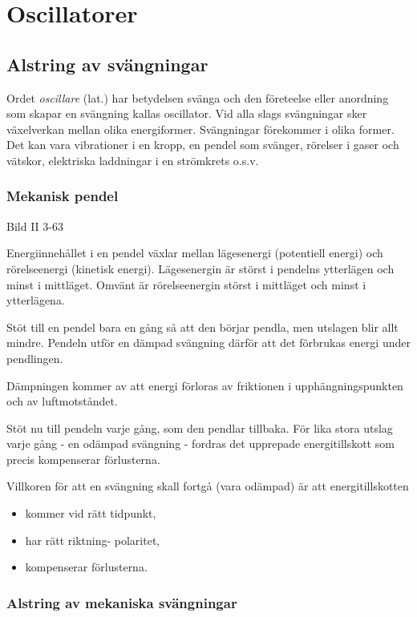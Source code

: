 \section{Oscillatorer}

\subsection{Alstring av svängningar}
Ordet \emph{oscillare} (lat.) har betydelsen svänga och den företeelse
eller anordning som skapar en svängning kallas oscillator. Vid alla
slags svängningar sker växelverkan mellan olika
energiformer. Svängningar förekommer i olika former. Det kan vara
vibrationer i en kropp, en pendel som svänger, rörelser i gaser och
vätskor, elektriska laddningar i en strömkrets o.s.v.

\subsubsection{Mekanisk pendel}

Bild II 3-63

Energiinnehållet i en pendel växlar mellan lägesenergi (potentiell
energi) och rörelseenergi (kinetisk energi). Lägesenergin är störst i
pendelns ytterlägen och minst i mittläget. Omvänt är rörelseenergin
störst i mittläget och minst i ytterlägena.

Stöt till en pendel bara en gång så att den börjar pendla, men
utslagen blir allt mindre. Pendeln utför en dämpad svängning därför
att det förbrukas energi under pendlingen.

Dämpningen kommer av att energi förloras av friktionen i
upphängningspunkten och av luftmotståndet.

Stöt nu till pendeln varje gång, som den pendlar tillbaka. För lika
stora utslag varje gång - en odämpad svängning - fordras det upprepade
energitillskott som precis kompenserar förlusterna.

Villkoren för att en svängning skall fortgå (vara odämpad) är att
energitillskotten
\begin{itemize}
\item kommer vid rätt tidpunkt,
\item har rätt riktning- polaritet,
\item kompenserar förlusterna.
\end{itemize}

\subsubsection{Alstring av mekaniska svängningar}

